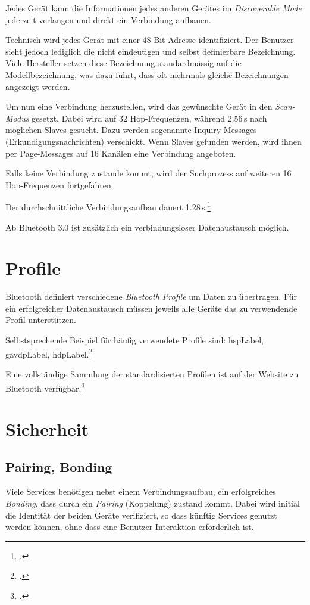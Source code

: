 Jedes Gerät kann die Informationen jedes anderen Gerätes im \textit{Discoverable Mode} jederzeit verlangen und direkt ein Verbindung aufbauen.

Technisch wird jedes Gerät mit einer 48-Bit Adresse identifiziert. Der Benutzer sieht jedoch lediglich die nicht eindeutigen und selbst definierbare Bezeichnung. Viele Hersteller setzen diese Bezeichnung standardmässig auf die Modellbezeichnung, was dazu führt, dass oft mehrmals gleiche Bezeichnungen angezeigt werden.

Um nun eine Verbindung herzustellen, wird das gewünschte Gerät in den \textit{Scan-Modus} gesetzt.
Dabei wird auf 32 Hop-Frequenzen, während 2.56\,s nach möglichen Slaves gesucht. Dazu werden sogenannte Inquiry-Messages (Erkundigungsnachrichten) verschickt.
Wenn Slaves gefunden werden, wird ihnen per Page-Messages auf 16 Kanälen eine Verbindung angeboten.

Falls keine Verbindung zustande kommt, wird der Suchprozess auf weiteren 16 Hop-Frequenzen fortgefahren.

Der durchschnittliche Verbindungsaufbau dauert 1.28\,s.\footcite{Bluetooth_de_Wikipedia_2015-04-18}

Ab Bluetooth 3.0 ist zusätzlich ein verbindungsloser Datenaustausch möglich.

\section{Profile}
Bluetooth definiert verschiedene \textit{Bluetooth Profile} um Daten zu übertragen.
Für ein erfolgreicher Datenaustausch müssen jeweils alle Geräte das zu verwendende Profil unterstützen.

Selbstsprechende Beispiel für häufig verwendete Profile sind: \gls{hspLabel}, \gls{gavdpLabel}, \gls{hdpLabel}.\footcite{List_of_Bluetooth_profiles_Wikipedia_2015-04-27}

Eine vollständige Sammlung der standardisierten Profilen ist auf der Website zu Bluetooth verfügbar.\footcite{Profiles_Overview_Bluetooth_Development_Portal_2015-04-27}


\section{Sicherheit}

\subsection{Pairing, Bonding}
Viele Services benötigen nebst einem Verbindungsaufbau, ein erfolgreiches \textit{Bonding}, dass durch ein \textit{Pairing} (Koppelung) zustand kommt.
Dabei wird initial die Identität der beiden Geräte verifiziert, so dass künftig Services genutzt werden können, ohne dass eine Benutzer Interaktion erforderlich ist.

